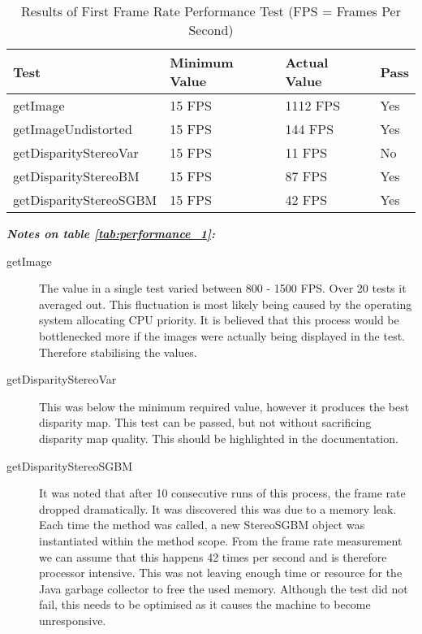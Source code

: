 \begin{table}[h]
\centering
\small
\begin{tabular}{llll}
\hline
\textbf{Test} & \textbf{Minimum Value} & \textbf{Actual Value} & \textbf{Pass}
\\ \hline
getImage                  & 15 FPS                 & 1112 FPS            & Yes           \\ 
getImageUndistorted       & 15 FPS                 & 144 FPS             & Yes           \\ 
getDisparityStereoVar     & 15 FPS                 & 11 FPS              & No            \\ 
getDisparityStereoBM      & 15 FPS                 & 87 FPS              & Yes           \\ 
getDisparityStereoSGBM    & 15 FPS                 & 42 FPS              & Yes           \\ \hline
\end{tabular}
\caption{Results of First Frame Rate Performance Test (FPS = Frames Per Second)\protect {\label{tab:performance_1}}}
\end{table}

\textbf{\textit{Notes on table \ref{tab:performance_1}:}}
\begin{description}
	\item[getImage] The value in a single test varied between 800 - 1500 FPS.
	Over 20 tests it averaged out.
	This fluctuation is most likely being caused by the operating system allocating CPU priority.
	It is believed that this process would be bottlenecked more if the images were actually being displayed in the test.
	Therefore stabilising the values.
	\item[getDisparityStereoVar] This was below the minimum required value, however it produces the best disparity map.
	This test can be passed, but not without sacrificing disparity map quality.
	This should be highlighted in the documentation.
	\item[getDisparityStereoSGBM] It was noted that after 10 consecutive runs of this process, the frame rate dropped dramatically.
	It was discovered this was due to a memory leak.
	Each time the method  was called, a new StereoSGBM object was instantiated within the method scope. From the frame rate measurement we can assume that this happens 42 times per second and is therefore processor intensive. This was not leaving enough time or resource for the Java garbage collector to free the used memory. Although the test did not fail, this needs to be optimised as it causes the machine to become unresponsive.
	
\end{description}